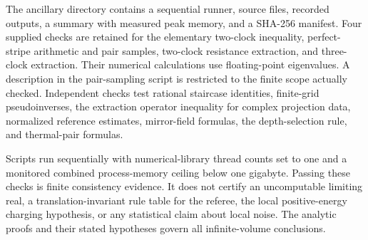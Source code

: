 The ancillary directory contains a sequential runner, source files,
recorded outputs, a summary with measured peak memory, and a SHA-256
manifest. Four supplied checks are retained for the elementary
two-clock inequality, perfect-stripe arithmetic and pair samples,
two-clock resistance extraction, and three-clock extraction. Their
numerical calculations use floating-point eigenvalues. A description
in the pair-sampling script is restricted to the finite scope actually
checked. Independent checks test rational staircase identities,
finite-grid pseudoinverses, the extraction operator inequality for
complex projection data, normalized reference estimates, mirror-field
formulas, the depth-selection rule, and thermal-pair formulas.

Scripts run sequentially with numerical-library thread counts set to
one and a monitored combined process-memory ceiling below one gigabyte.
Passing these checks is finite consistency evidence. It does not
certify an uncomputable limiting real, a translation-invariant rule
table for the referee, the local positive-energy charging hypothesis,
or any statistical claim about local noise. The analytic proofs and
their stated hypotheses govern all infinite-volume conclusions.
